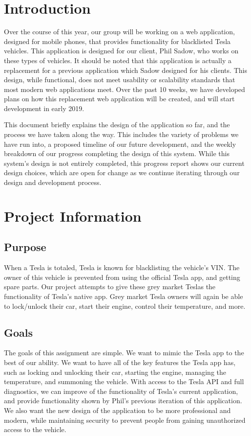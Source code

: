 \documentclass[onecolumn, draftclsnofoot,10pt, compsoc]{IEEEtran}
\begin{document}
\section{Introduction}
        Over the course of this year, our group will be working on a web application, designed for mobile phones, that provides functionality for blacklisted Tesla vehicles. This application is designed for our client, Phil Sadow, who works on these types of vehicles. It should be noted that this application is actually a replacement for a previous application which Sadow designed for his clients. This design, while functional, does not meet usability or scalability standards that most modern web applications meet. Over the past 10 weeks, we have developed plans on how this replacement web application will be created, and will start development in early 2019. 
        
        This document briefly explains the design of the application so far, and the process we have taken along the way. This includes the variety of problems we have run into, a proposed timeline of our future development, and the weekly breakdown of our progress completing the design of this system. While this system's design is not entirely completed, this progress report shows our current design choices, which are open for change as we continue iterating through our design and development process. 
\section{Project Information}
    \subsection{Purpose}
        When a Tesla is totaled, Tesla is known for blacklisting the vehicle's VIN. The owner of this vehicle is prevented from using the official Tesla app, and getting spare parts. Our project attempts to give these grey market Teslas the functionality of Tesla's native app. Grey market Tesla owners will again be able to lock/unlock their car, start their engine, control their temperature, and more.
    \subsection{Goals}
        The goals of this assignment are simple. We want to mimic the Tesla app to the best of our ability. We want to have all of the key features the Tesla app has, such as locking and unlocking their car, starting the engine, managing the temperature, and summoning the vehicle. With access to the Tesla API and full diagnostics, we can improve of the functionality of Tesla's current application, and provide functionality shown by Phil's previous iteration of this application. We also want the new design of the application to be more professional and modern, while maintaining security to prevent people from gaining unauthorized access to the vehicle.  
\end{document}
